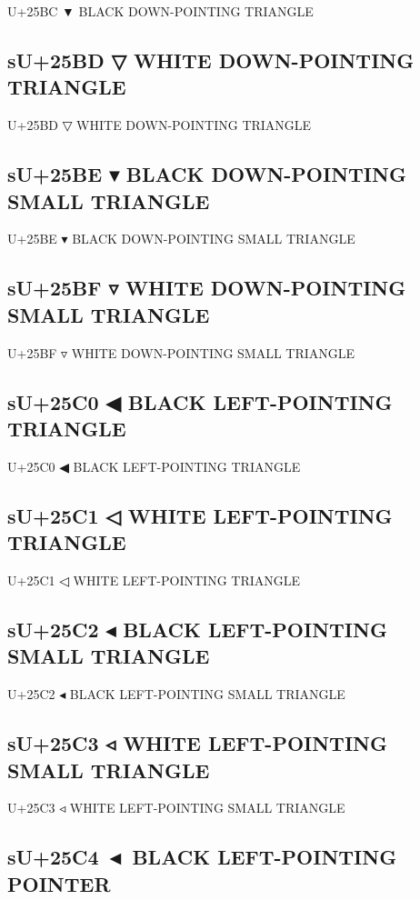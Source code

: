 U+25BC ▼ BLACK DOWN-POINTING TRIANGLE

\subsection{sU+25BD ▽ WHITE DOWN-POINTING TRIANGLE}

U+25BD ▽ WHITE DOWN-POINTING TRIANGLE

\subsection{sU+25BE ▾ BLACK DOWN-POINTING SMALL TRIANGLE}

U+25BE ▾ BLACK DOWN-POINTING SMALL TRIANGLE

\subsection{sU+25BF ▿ WHITE DOWN-POINTING SMALL TRIANGLE}

U+25BF ▿ WHITE DOWN-POINTING SMALL TRIANGLE

\subsection{sU+25C0 ◀ BLACK LEFT-POINTING TRIANGLE}

U+25C0 ◀ BLACK LEFT-POINTING TRIANGLE

\subsection{sU+25C1 ◁ WHITE LEFT-POINTING TRIANGLE}

U+25C1 ◁ WHITE LEFT-POINTING TRIANGLE

\subsection{sU+25C2 ◂ BLACK LEFT-POINTING SMALL TRIANGLE}

U+25C2 ◂ BLACK LEFT-POINTING SMALL TRIANGLE

\subsection{sU+25C3 ◃ WHITE LEFT-POINTING SMALL TRIANGLE}

U+25C3 ◃ WHITE LEFT-POINTING SMALL TRIANGLE

\subsection{sU+25C4 ◄ BLACK LEFT-POINTING POINTER}

